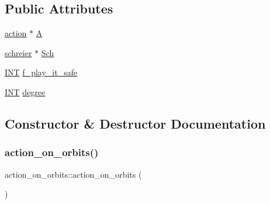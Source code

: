 \subsection*{Public Attributes}
\begin{DoxyCompactItemize}
\item 
\mbox{\hyperlink{classaction}{action}} $\ast$ \mbox{\hyperlink{classaction__on__orbits_a0093589ff431dbef11cfdde928b4b5f3}{A}}
\item 
\mbox{\hyperlink{classschreier}{schreier}} $\ast$ \mbox{\hyperlink{classaction__on__orbits_a229383dae1c4102b8ac54df3263677d2}{Sch}}
\item 
\mbox{\hyperlink{galois_8h_a09fddde158a3a20bd2dcadb609de11dc}{I\+NT}} \mbox{\hyperlink{classaction__on__orbits_a7c1268383dd0a1ee5af6c8890721d8d8}{f\+\_\+play\+\_\+it\+\_\+safe}}
\item 
\mbox{\hyperlink{galois_8h_a09fddde158a3a20bd2dcadb609de11dc}{I\+NT}} \mbox{\hyperlink{classaction__on__orbits_acad649b81d8339bac8926ca7806d1219}{degree}}
\end{DoxyCompactItemize}


\subsection{Constructor \& Destructor Documentation}
\mbox{\label{classaction__on__orbits_aee8456259fe7933e8f42c337145d7243}} 
\subsubsection{\texorpdfstring{action\+\_\+on\+\_\+orbits()}{action\_on\_orbits()}}
{\footnotesize\ttfamily action\+\_\+on\+\_\+orbits\+::action\+\_\+on\+\_\+orbits (\begin{DoxyParamCaption}{ }\end{DoxyParamCaption})}

\mbox{\label{classaction__on__orbits_abbb682d9b41be063bdbbbf815a4ec402}} 
